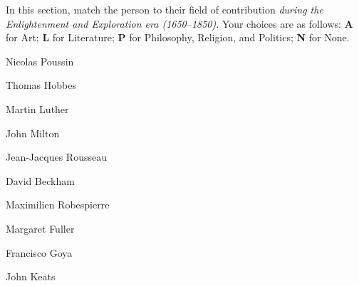 \documentclass[12pt]{examdesign}
\begin{document}
\begin{fillin}[title={People}]
	In this section, match the person to their field of contribution \emph{during the Enlightenment and Exploration era (1650--1850)}. Your choices are as follows: \textbf{A} for Art; \textbf{L} for Literature; \textbf{P} for Philosophy, Religion, and Politics; \textbf{N} for None.

	\begin{question}
		  Nicolas Poussin
	\end{question}

	\begin{question}
		  Thomas Hobbes
	\end{question}

	\begin{question}
		  Martin Luther
	\end{question}

	\begin{question}
		  John Milton
	\end{question}

	\begin{question}
		  Jean-Jacques Rousseau
	\end{question}

	\begin{question}
		  David Beckham
	\end{question}

	\begin{question}
		  Maximilien Robespierre
	\end{question}

	\begin{question}
		  Margaret Fuller
	\end{question}

	\begin{question}
		  Francisco Goya
	\end{question}

	\begin{question}
		  John Keats
	\end{question}
\end{fillin}
\end{document}
